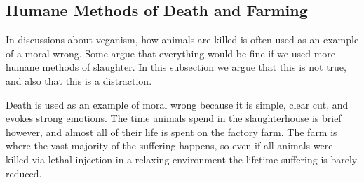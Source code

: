 \subsection{Humane Methods of Death and Farming}

In discussions about veganism, how animals are killed is often used as an example of a moral wrong. Some argue that everything would be fine if we used more humane methods of slaughter. In this subsection we argue that this is not true, and also that this is a distraction.

Death is used as an example of moral wrong because it is simple, clear cut, and evokes strong emotions. The time animals spend in the slaughterhouse is brief however, and almost all of their life is spent on the factory farm. The farm is where the vast majority of the suffering happens, so even if all animals were killed via lethal injection in a relaxing environment the lifetime suffering is barely reduced.